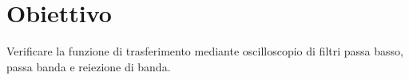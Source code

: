 \section{Obiettivo}

Verificare la funzione di trasferimento mediante oscilloscopio di filtri passa basso, passa banda e reiezione di banda.